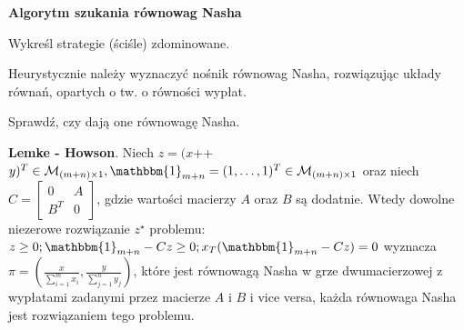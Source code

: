 \begin{definicja}
    \textbf{Algorytm szukania równowag Nasha}
    \begin{enumerate*}[label=\roman*)] 
        \item Wykreśl strategie (ściśle) zdominowane. 
        \item Heurystycznie należy wyznaczyć nośnik równowag Nasha, rozwiązując układy równań, opartych o tw. o równości wypłat.
        \item Sprawdź, czy dają one równowagę Nasha.
    \end{enumerate*}
\end{definicja} 

\begin{twierdzenie}
    \textbf{Lemke - Howson}. Niech $z = (x $++$ y)^T \in \mathcal{M}_{(m+n) \times 1}, \mathbbm{1}_{m+n} = (1,\dots,1)^T \in \mathcal{M}_{(m+n) \times 1}$ oraz niech $C = \begin{bmatrix} 0 & A \\ B^T & 0 \end{bmatrix}$, gdzie wartości macierzy $A$ oraz $B$ są dodatnie. Wtedy dowolne niezerowe rozwiązanie $z^{\star}$ problemu: $z \geq 0; \mathbbm{1}_{m+n} - Cz \geq 0; x_T (\mathbbm{1}_{m+n} - Cz ) = 0$ wyznacza $\pi = \left(\frac{x}{\sum_{i=1}^m x_i} ,\frac{y}{\sum_{j=1}^n y_j}\right)$, które jest równowagą Nasha w grze dwumacierzowej z wypłatami zadanymi przez macierze $A$ i $B$ i vice versa, każda równowaga Nasha jest rozwiązaniem tego problemu.
\end{twierdzenie}

